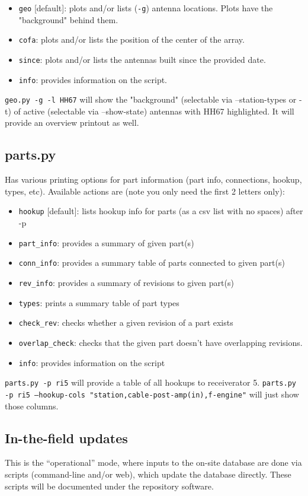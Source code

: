 \documentclass{article}[10pt]
\begin{document}
\begin{itemize}
\item {\tt geo} [default]:  plots and/or lists ({\tt -g}) antenna locations.  Plots have the "background" behind them.
\item {\tt cofa}:  plots and/or lists the position of the center of the array.
\item {\tt since}:  plots and/or lists the antennas built since the provided date.
\item {\tt info}:  provides information on the script.
\end{itemize}

{\tt geo.py -g -l HH67} will show the "background" (selectable via --station-types or -t) of active (selectable via --show-state) antennas with HH67 highlighted.  It will provide an overview printout as well.

\subsection{parts.py}
Has various printing options for part information (part info, connections, hookup, types, etc).  Available actions are (note you only need the first 2 letters only):

\begin{itemize}
\item {\tt hookup} [default]:  lists hookup info for parts (as a csv list with no spaces) after -p
\item {\tt part\_info}:   provides a summary of given part(s)
\item {\tt conn\_info}:   provides a summary table of parts connected to given part(s)
\item {\tt rev\_info}:  provides a summary of revisions to given part(s)
\item {\tt types}:  prints a summary table of part types
\item {\tt check\_rev}:  checks whether a given revision of a part exists
\item {\tt overlap\_check}:  checks that the given part doesn't have overlapping revisions.
\item {\tt info}:   provides information on the script
\end{itemize}

{\tt parts.py -p ri5} will provide a table of all hookups to receiverator 5.  {\tt parts.py -p ri5 --hookup-cols "station,cable-post-amp(in),f-engine"}  will just show those columns.

\subsection{In-the-field updates}
This is the ``operational'' mode, where inputs to the on-site database are done via scripts (command-line and/or web), which update the database directly.  These scripts will be documented under the repository software.
\end{document}
